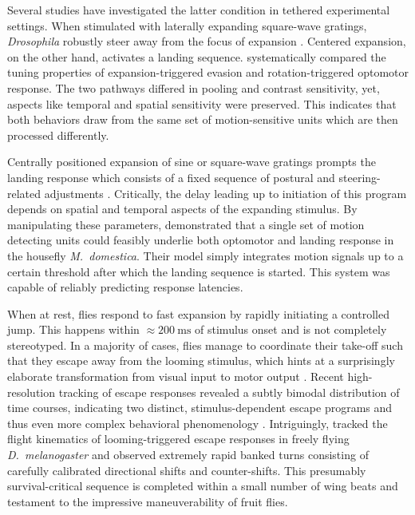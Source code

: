 Several studies have investigated the latter condition in tethered experimental settings. When stimulated with laterally expanding square-wave gratings, \textit{Drosophila} robustly steer away from the focus of expansion \citep{Tammero:2002aa}. Centered expansion, on the other hand, activates a landing sequence. \citet{Duistermars:2007aa} systematically compared the tuning properties of expansion-triggered evasion and rotation-triggered optomotor response. The two pathways differed in pooling and contrast sensitivity, yet, aspects like temporal and spatial sensitivity were preserved. This indicates that both behaviors draw from the same set of motion-sensitive units which are then processed differently.

Centrally positioned expansion of sine or square-wave gratings prompts the landing response which consists of a fixed sequence of postural and steering-related adjustments \citep{Goodman:1960aa,Braitenberg:1966aa,Borst:1986wx}. Critically, the delay leading up to initiation of this program depends on spatial and temporal aspects of the expanding stimulus. By manipulating these parameters, \citet{Bahde:1986eh} demonstrated that a single set of motion detecting units could feasibly underlie both optomotor and landing response in the housefly \textit{M.\ domestica}. Their model simply integrates motion signals up to a certain threshold after which the landing sequence is started. This system was capable of reliably predicting response latencies.

When at rest, flies respond to fast expansion by rapidly initiating a controlled jump. This happens within $\approx\SI{200}{\milli\second}$ of stimulus onset and is not completely stereotyped. In a majority of cases, flies manage to coordinate their take-off such that they escape away from the looming stimulus, which hints at a surprisingly elaborate transformation from visual input to motor output \citep{Card:2008aa}. Recent high-resolution tracking of escape responses revealed a subtly bimodal distribution of time courses, indicating two distinct, stimulus-dependent escape programs and thus even more complex behavioral phenomenology \citep{Reyn:2014aa}. Intriguingly, \citet{Muijres:2014aa} tracked the flight kinematics of looming-triggered escape responses in freely flying \textit{D.\ melanogaster} and observed extremely rapid banked turns consisting of carefully calibrated directional shifts and counter-shifts. This presumably survival-critical sequence is completed within a small number of wing beats and testament to the impressive maneuverability of fruit flies.

